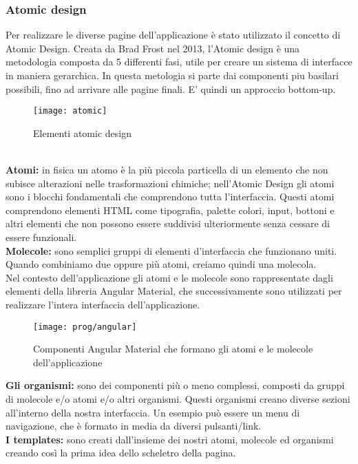 \subsubsection{Atomic design}
Per realizzare le diverse pagine dell'applicazione è stato utilizzato il concetto di Atomic Design.
Creata da Brad Frost nel 2013, l'Atomic design è una metodologia composta da 5 differenti fasi, utile per creare un sistema di interfacce in maniera gerarchica. In questa metologia si parte dai componenti piu basilari possibili, fino ad arrivare alle pagine finali. E' quindi un approccio bottom-up.
\begin{figure}[!h] 
	\centering 
	\texttt{[image: atomic]} 
	\caption{Elementi atomic design}
\end{figure}
\\

\textbf{Atomi:} in fisica un atomo è la più piccola particella di un elemento che non subisce alterazioni nelle trasformazioni chimiche; nell’Atomic Design gli atomi sono i blocchi fondamentali che comprendono tutta l’interfaccia.
Questi atomi comprendono elementi HTML come tipografia, palette colori, input, bottoni e altri elementi che non possono essere suddivisi ulteriormente senza cessare di essere funzionali.
\\

\textbf{Molecole:} sono semplici gruppi di elementi d'interfaccia che funzionano uniti. Quando combiniamo due oppure più atomi, creiamo quindi una molecola.
\\

Nel contesto dell'applicazione gli atomi e le molecole sono rappresentate dagli elementi della libreria Angular Material, che successivamente sono utilizzati per realizzare l'intera interfaccia dell'applicazione.

\begin{figure}[!h] 
	\centering 
	\texttt{[image: prog/angular]} 
	\caption{Componenti Angular Material che formano gli atomi e le molecole dell'applicazione}
\end{figure} 
\newpage
\textbf{Gli organismi:} sono dei componenti più o meno complessi, composti da gruppi di molecole e/o atomi e/o altri organismi. Questi organismi creano diverse sezioni all'interno della nostra interfaccia. Un esempio può essere un menu di navigazione, che è formato in media da diversi pulsanti/link. 
\\

\textbf{I templates:} sono creati dall'insieme dei nostri atomi, molecole ed organismi creando così la prima idea dello scheletro della pagina.
\\

